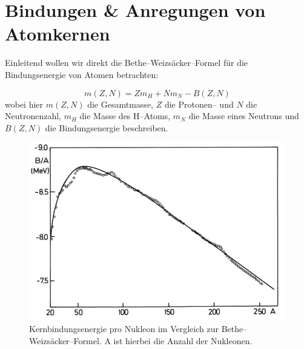 \documentclass[Ex4_Zusammenfassung.tex]{subfiles}
\begin{document}
\chapter{Bindungen \& Anregungen von Atomkernen}
Einleitend wollen wir direkt die Bethe--Weizsäcker--Formel für die Bindungsenergie von Atomen betrachten:

\begin{equation}
	m(Z,N) = Z m_H + N m_N - B(Z,N)
\end{equation}
wobei hier $m(Z,N)$ die Gesamtmasse, $Z$ die Protonen-- und $N$ die Neutronenzahl, $m_H$ die Masse des H--Atoms, $m_N$ die Masse eines Neutrons und $B(Z,N)$ die Bindungsenergie beschreiben.

\begin{figure}[h]
	\centering
	\includegraphics[scale=0.5]{bethe-weizsaecker.png}
	\caption{Kernbindungsenergie pro Nukleon im Vergleich zur Bethe--Weizsäcker--Formel. A ist hierbei die Anzahl der Nukleonen.}
\end{figure}
\end{document}
